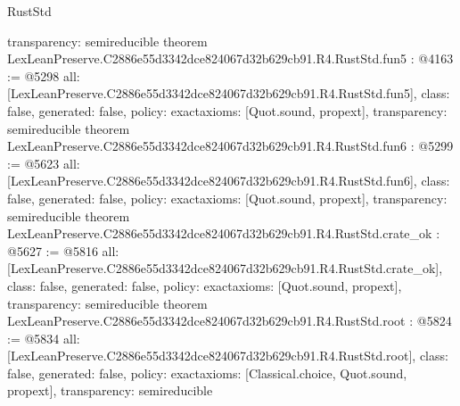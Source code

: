 \begin{lexlean}{RustStd}
\begin{coremodule}
{  transparency: semireducible
}
theorem LexLeanPreserve.C2886e55d3342dce824067d32b629cb91.R4.RustStd.fun5 : @4163 := @5298 {
  all: [LexLeanPreserve.C2886e55d3342dce824067d32b629cb91.R4.RustStd.fun5],
  class: false,
  generated: false,
  policy: exact{axioms: [Quot.sound, propext]},
  transparency: semireducible
}
theorem LexLeanPreserve.C2886e55d3342dce824067d32b629cb91.R4.RustStd.fun6 : @5299 := @5623 {
  all: [LexLeanPreserve.C2886e55d3342dce824067d32b629cb91.R4.RustStd.fun6],
  class: false,
  generated: false,
  policy: exact{axioms: [Quot.sound, propext]},
  transparency: semireducible
}
theorem LexLeanPreserve.C2886e55d3342dce824067d32b629cb91.R4.RustStd.crate_ok : @5627 := @5816 {
  all: [LexLeanPreserve.C2886e55d3342dce824067d32b629cb91.R4.RustStd.crate_ok],
  class: false,
  generated: false,
  policy: exact{axioms: [Quot.sound, propext]},
  transparency: semireducible
}
theorem LexLeanPreserve.C2886e55d3342dce824067d32b629cb91.R4.RustStd.root : @5824 := @5834 {
  all: [LexLeanPreserve.C2886e55d3342dce824067d32b629cb91.R4.RustStd.root],
  class: false,
  generated: false,
  policy: exact{axioms: [Classical.choice, Quot.sound, propext]},
  transparency: semireducible
}


\end{coremodule}
\end{lexlean}
